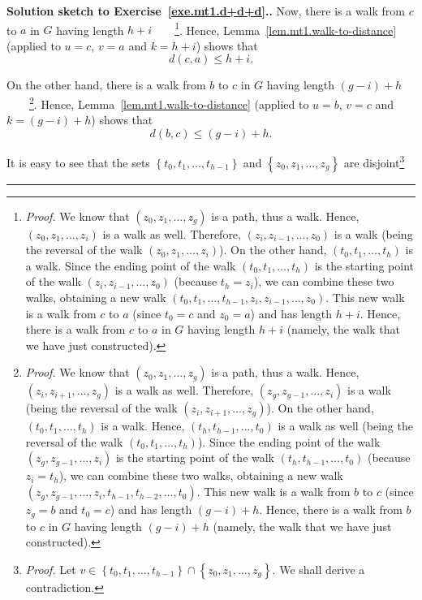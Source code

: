 \documentclass[numbers=enddot,12pt,final,onecolumn,notitlepage]{scrartcl}%
\theoremstyle{definition}
\newenvironment{proof}[1][Proof]{\noindent\textbf{#1.} }{\ \rule{0.5em}{0.5em}}
\newcommand{\set}[1]{\left\{ #1 \right\}}
\newcommand{\tup}[1]{\left( #1 \right)}
\begin{document}
\begin{proof}[Solution sketch to Exercise~\ref{exe.mt1.d+d+d}.]
Now, there is a walk from $c$ to $a$ in $G$ having length
$h + i$\ \ \ \ \footnote{\textit{Proof.} We know that
$\tup{z_0, z_1, \ldots, z_g}$ is a path, thus a walk. Hence,
$\tup{z_0, z_1, \ldots, z_i}$ is a walk as well. Therefore,
$\tup{z_i, z_{i-1}, \ldots, z_0}$ is a walk (being the reversal
of the walk $\tup{z_0, z_1, \ldots, z_i}$). On the other hand,
$\tup{t_0, t_1, \ldots, t_h}$ is a walk.
Since the ending point of the walk $\tup{t_0, t_1, \ldots, t_h}$
is the starting point of the walk
$\tup{z_i, z_{i-1}, \ldots, z_0}$ (because $t_h = z_i$), we can
combine these two walks, obtaining a new walk
$\tup{t_0, t_1, \ldots, t_{h-1}, z_i, z_{i-1}, \ldots, z_0}$.
This new walk is a walk from $c$ to $a$ (since $t_0 = c$ and
$z_0 = a$) and has length $h + i$. Hence, there is a
walk from $c$ to $a$ in $G$ having length $h + i$ (namely, the
walk that we have just constructed).}. Hence,
Lemma~\ref{lem.mt1.walk-to-distance} (applied to $u = c$, $v = a$
and $k = h + i$) shows that
\begin{equation}
d \tup{c, a} \leq h + i .
\label{pf.exe.mt1.d+d+d.walk1}
\end{equation}

On the other hand, there is a walk from $b$ to $c$ in $G$ having
length $\tup{g-i} + h$\ \ \ \ \footnote{\textit{Proof.} We know that
$\tup{z_0, z_1, \ldots, z_g}$ is a path, thus a walk. Hence,
$\tup{z_i, z_{i+1}, \ldots, z_g}$ is a walk as well. Therefore,
$\tup{z_g, z_{g-1}, \ldots, z_i}$ is a walk (being the reversal
of the walk $\tup{z_i, z_{i+1}, \ldots, z_g}$). On the other hand,
$\tup{t_0, t_1, \ldots, t_h}$ is a walk. Hence,
$\tup{t_h, t_{h-1}, \ldots, t_0}$ is a walk as well
(being the reversal of the walk $\tup{t_0, t_1, \ldots, t_h}$).
Since the ending point of the walk $\tup{z_g, z_{g-1}, \ldots, z_i}$
is the starting point of the walk
$\tup{t_h, t_{h-1}, \ldots, t_0}$ (because $z_i = t_h$), we can
combine these two walks, obtaining a new walk
$\tup{z_g, z_{g-1}, \ldots, z_i, t_{h-1}, t_{h-2}, \ldots, t_0}$.
This new walk is a walk from $b$ to $c$ (since $z_g = b$ and
$t_0 = c$) and has length $\tup{g-i} + h$. Hence, there is a
walk from $b$ to $c$ in $G$ having length $\tup{g-i} + h$ (namely,
the walk that we have just constructed).}. Hence,
Lemma~\ref{lem.mt1.walk-to-distance} (applied to $u = b$, $v = c$
and $k = \tup{g-i} + h$) shows that
\begin{equation}
d \tup{b, c} \leq \tup{g-i} + h .
\label{pf.exe.mt1.d+d+d.walk2}
\end{equation}

It is easy to see that the sets
$\set{t_0, t_1, \ldots, t_{h-1}}$ and
$\set{z_0, z_1, \ldots, z_g}$ are disjoint\footnote{\textit{Proof.}
Let $v \in
\set{t_0, t_1, \ldots, t_{h-1}} \cap \set{z_0, z_1, \ldots, z_g}$.
We shall derive a contradiction.

}
\end{proof}
\end{document}

